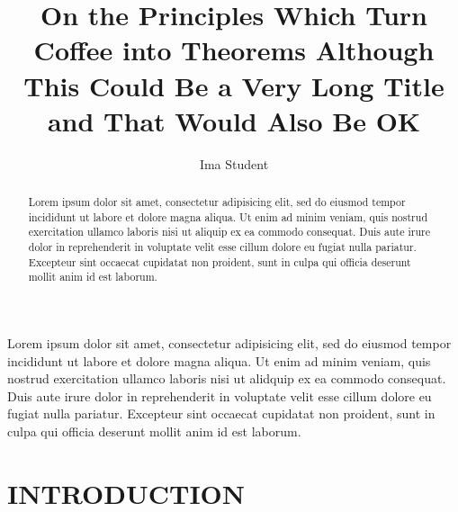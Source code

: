 \documentclass[12pt,oneside,final]{siuethesis}
\author{Ima Student}
\title{On the Principles Which Turn Coffee into Theorems Although This Could Be a Very Long Title and That Would Also Be OK}
\theoremstyle{definition}
\begin{document}
\maketitle 

\frontmatter %

\copyrightpage %

\begin{abstract}
Lorem ipsum dolor sit amet, consectetur adipisicing elit, sed do eiusmod tempor incididunt ut labore et dolore magna aliqua. Ut enim ad minim veniam, quis nostrud exercitation ullamco laboris nisi ut aliquip ex ea commodo consequat. Duis aute irure dolor in reprehenderit in voluptate velit esse cillum dolore eu fugiat nulla pariatur. Excepteur sint occaecat cupidatat non proident, sunt in culpa qui officia deserunt mollit anim id est laborum.
\end{abstract}

\begin{acknowledgements}
Lorem ipsum dolor sit amet, consectetur adipisicing elit, sed do eiusmod tempor incididunt ut labore et dolore magna aliqua. Ut enim ad minim veniam, quis nostrud exercitation ullamco laboris nisi ut alidquip ex ea commodo consequat. Duis aute irure dolor in reprehenderit in voluptate velit esse cillum dolore eu fugiat nulla pariatur. Excepteur sint occaecat cupidatat non proident, sunt in culpa qui officia deserunt mollit anim id est laborum.
\end{acknowledgements}

\tableofcontents

\cleardoublepage %

\listoffigures %
\listoftables %

\mainmatter %


\chapter{INTRODUCTION}  %
\thispagestyle{empty} %


\end{document}
